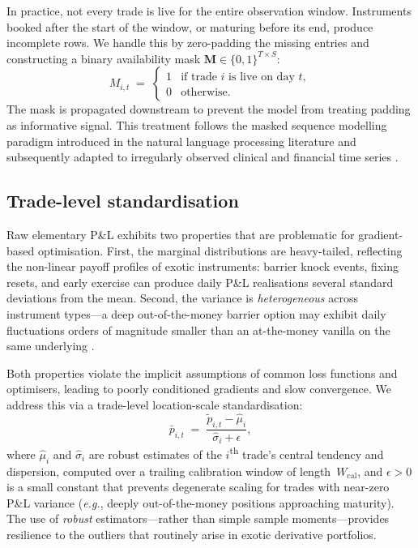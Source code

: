 \documentclass[11pt,a4paper]{article}
\newcommand{\bM}{\bm{M}}
\begin{document}
In practice, not every trade is live for the entire observation window.
Instruments booked after the start of the window, or maturing before its end,
produce incomplete rows.  We handle this by zero-padding the missing entries
and constructing a binary availability mask
$\bM \in \{0,1\}^{T \times S}$:
%
\begin{equation}\label{eq:mask}
  M_{i,t}
  \;=\;
  \begin{cases}
    1 & \text{if trade } i \text{ is live on day } t, \\
    0 & \text{otherwise}.
  \end{cases}
\end{equation}
%
The mask is propagated downstream to prevent the model from treating padding
as informative signal.  This treatment follows the masked sequence modelling
paradigm introduced in the natural language processing literature
\cite{devlin2019bert} and subsequently adapted to irregularly observed
clinical and financial time series \cite{che2018recurrent}.


\subsection{Trade-level standardisation}\label{sec:pnl:standardise}

Raw elementary P\&L exhibits two properties that are problematic for
gradient-based optimisation.  First, the marginal distributions are
heavy-tailed, reflecting the non-linear payoff profiles of exotic instruments:
barrier knock events, fixing resets, and early exercise can produce daily P\&L
realisations several standard deviations from the mean.  Second, the variance
is \emph{heterogeneous} across instrument types---a deep out-of-the-money
barrier option may exhibit daily fluctuations orders of magnitude smaller than
an at-the-money vanilla on the same underlying \cite{cont2001empirical}.

Both properties violate the implicit assumptions of common loss functions and
optimisers, leading to poorly conditioned gradients and slow convergence.  We
address this via a trade-level location-scale standardisation:
%
\begin{equation}\label{eq:standardise}
  \bar{p}_{i,t}
  \;=\;
  \frac{\tilde{p}_{i,t} - \hat{\mu}_i}{\hat{\sigma}_i + \epsilon},
\end{equation}
%
where $\hat{\mu}_i$ and $\hat{\sigma}_i$ are robust estimates of the
$i$\textsuperscript{th} trade's central tendency and dispersion, computed over
a trailing calibration window of length~$W_{\mathrm{cal}}$, and
$\epsilon > 0$ is a small constant that prevents degenerate scaling for trades
with near-zero P\&L variance (\emph{e.g.}, deeply out-of-the-money positions
approaching maturity).  The use of \emph{robust} estimators---rather than
simple sample moments---provides resilience to the outliers that routinely
arise in exotic derivative portfolios.
\end{document}
